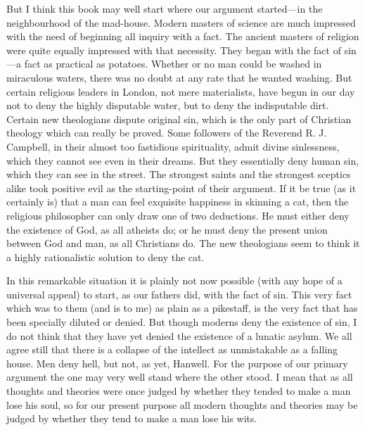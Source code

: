 But I think this book may well start where our argument started—in the neighbourhood of the mad-house. Modern masters of science are much impressed with the need of beginning all inquiry with a fact. The ancient masters of religion were quite equally impressed with that necessity. They began with the fact of sin—a fact as practical as potatoes. Whether or no man could be washed in miraculous waters, there was no doubt at any rate that he wanted washing. But certain religious leaders in London, not mere materialists, have begun in our day not to deny the highly disputable water, but to deny the indisputable dirt. Certain new theologians dispute original sin, which is the only part of Christian theology which can really be proved. Some followers of the Reverend R. J. Campbell, in their almost too fastidious spirituality, admit divine sinlessness, which they cannot see even in their dreams. But they essentially deny human sin, which they can see in the street. The strongest saints and the strongest sceptics alike took positive evil as the starting-point of their argument. If it be true (as it certainly is) that a man can feel exquisite happiness in skinning a cat, then the religious philosopher can only draw one of two deductions. He must either deny the existence of God, as all atheists do; or he must deny the present union between God and man, as all Christians do. The new theologians seem to think it a highly rationalistic solution to deny the cat.

In this remarkable situation it is plainly not now possible (with any hope of a universal appeal) to start, as our fathers did, with the fact of sin. This very fact which was to them (and is to me) as plain as a pikestaff, is the very fact that has been specially diluted or denied. But though moderns deny the existence of sin, I do not think that they have yet denied the existence of a lunatic asylum. We all agree still that there is a collapse of the intellect as unmistakable as a falling house. Men deny hell, but not, as yet, Hanwell. For the purpose of our primary argument the one may very well stand where the other stood. I mean that as all thoughts and theories were once judged by whether they tended to make a man lose his soul, so for our present purpose all modern thoughts and theories may be judged by whether they tend to make a man lose his wits.

